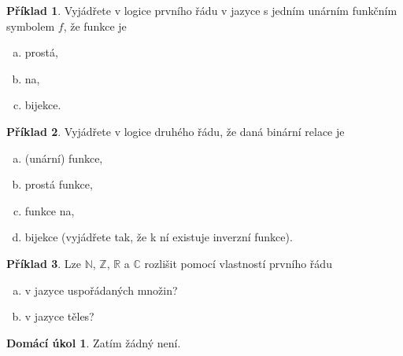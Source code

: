 \documentclass[a4paper]{article}
\theoremstyle{definition}
\newtheorem{problem}{Příklad}
\newtheorem*{ukol}{Domácí úkol}
\begin{document}
\medskip\begin{problem} Vyjádřete v logice prvního řádu v jazyce s jedním unárním funkčním symbolem $f$, že funkce je
\begin{enumerate}[(a)]
    \item prostá,
    \item na,
    \item bijekce.
\end{enumerate}
\end{problem}


\medskip\begin{problem} Vyjádřete v logice druhého řádu, že daná binární relace je 
\begin{enumerate}[(a)]
    \item (unární) funkce,
    \item prostá funkce,
    \item funkce na,
    \item bijekce (vyjádřete tak, že k ní existuje inverzní funkce).
\end{enumerate}
\end{problem}


\medskip\begin{problem}
Lze $\mathbb N$, $\mathbb Z$, $\mathbb R$ a $\mathbb C$ rozlišit pomocí vlastností prvního řádu
\begin{enumerate}[(a)]
    \item v jazyce uspořádaných množin?
    \item v jazyce těles?
\end{enumerate}
\end{problem}


\medskip\begin{ukol}
Zatím žádný není.
\end{ukol}
\end{document}
